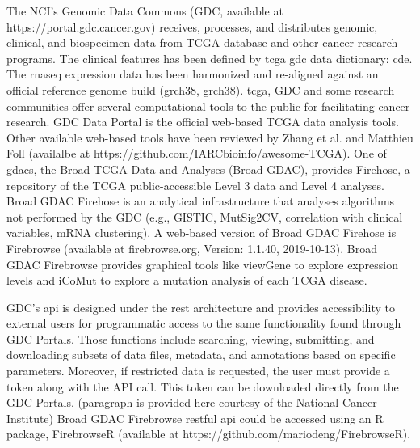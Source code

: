 \documentclass[jpm,article,submit,moreauthors,pdftex]{Definitions/mdpi}
\begin{document}
\begin{paracol}{2}
The NCI's Genomic Data Commons (GDC, available at https://portal.gdc.cancer.gov) receives, processes, and distributes genomic, clinical, and biospecimen data from TCGA database and other cancer research programs. The clinical features has been defined by \acrshort{tcga} \acrshort{gdc} data dictionary: \acrfull{cde}\cite{CDE2019}. The \acrshort{rnaseq} expression data has been harmonized and re-aligned against an official reference genome build (\acrlong{grch38}, \acrshort{grch38}).
\acrshort{tcga}, GDC and some research communities offer several computational tools to the public for facilitating cancer research. %
GDC Data Portal is the official web-based TCGA data analysis tools. Other available web-based tools have been reviewed by Zhang et al.\cite{Zhang2019b} and 
Matthieu Foll (availalbe at https://github.com/IARCbioinfo/awesome-TCGA).
One of \acrshort{gdac}s, the Broad TCGA Data and Analyses (Broad GDAC), provides Firehose, a repository of the TCGA public-accessible Level 3 data and Level 4 analyses. Broad GDAC Firehose is an analytical infrastructure that analyses algorithms not performed by the GDC (e.g., GISTIC, MutSig2CV, correlation with clinical variables, mRNA clustering). 
A web-based version of Broad GDAC Firehose is Firebrowse (available at firebrowse.org, Version: 1.1.40, 2019-10-13).
Broad GDAC Firebrowse provides graphical tools like viewGene to explore expression levels and iCoMut to explore a mutation analysis of each TCGA disease. 


GDC's \acrfull{api} is designed under the \acrfull{rest} architecture and provides accessibility to external users for programmatic access to the same functionality found through GDC Portals. Those functions include searching, viewing, submitting, and downloading subsets of data files, metadata, and annotations based on specific parameters. Moreover, if restricted data is requested, the user must provide a token along with the API call. This token can be downloaded directly from the GDC Portals. (paragraph is provided here courtesy of the National Cancer Institute)
Broad GDAC Firebrowse \acrshort{rest}ful \acrshort{api} could be accessed using an R package, FirebrowseR (available at https://github.com/mariodeng/FirebrowseR)\cite{Deng2017}.


\end{paracol}
\end{document}
